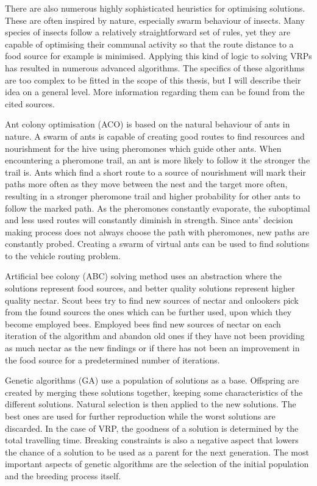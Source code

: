 There are also numerous highly sophisticated heuristics for optimising solutions. These are often inspired by nature, especially swarm behaviour of insects. Many species of insects follow a relatively straightforward set of rules, yet they are capable of optimising their communal activity so that the route distance to a food source for example is minimised. Applying this kind of logic to solving VRPs has resulted in numerous advanced algorithms. The specifics of these algorithms are too complex to be fitted in the scope of this thesis, but I will describe their idea on a general level. More information regarding them can be found from the cited sources. \cite{karaboga2014comprehensive}

Ant colony optimisation (ACO) is based on the natural behaviour of ants in nature. A swarm of ants is capable of creating good routes to find resources and nourishment for the hive using pheromones which guide other ants. When encountering a pheromone trail, an ant is more likely to follow it the stronger the trail is. Ants which find a short route to a source of nourishment will mark their paths more often as they move between the nest and the target more often, resulting in a stronger pheromone trail and higher probability for other ants to follow the marked path. As the pheromones constantly evaporate, the suboptimal and less used routes will constantly diminish in strength. Since ants' decision making process does not always choose the path with pheromones, new paths are constantly probed. Creating a swarm of virtual ants can be used to find solutions to the vehicle routing problem. \cite{bell2004ant} 

Artificial bee colony (ABC) solving method uses an abstraction where the solutions represent food sources, and better quality solutions represent higher quality nectar. Scout bees try to find new sources of nectar and onlookers pick from the found sources the ones which can be further used, upon which they become employed bees. Employed bees find new sources of nectar on each iteration of the algorithm and abandon old ones if they have not been providing as much nectar as the new findings or if there has not been an improvement in the food source for a predetermined number of iterations. \cite{szeto2011artificial}

Genetic algorithms (GA) use a population of solutions as a base. Offspring are created by merging these solutions together, keeping some characteristics of the different solutions. Natural selection is then applied to the new solutions. The best ones are used for further reproduction while the worst solutions are discarded. In the case of VRP, the goodness of a solution is determined by the total travelling time. Breaking constraints is also a negative aspect that lowers the chance of a solution to be used as a parent for the next generation. The most important aspects of genetic algorithms are the selection of the initial population and the breeding process itself. \cite{baker2003genetic}


